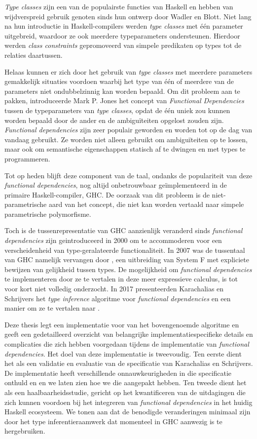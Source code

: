 \textit{Type classes} zijn een van de populairste functies van Haskell en hebben
van wijdverspreid gebruik genoten sinds hun ontwerp door Wadler en Blott.  Niet
lang na hun introductie in Haskell-compilers werden \textit{type classes} met
één parameter uitgebreid, waardoor ze ook meerdere typeparameters ondersteunen.
Hierdoor werden \textit{class constraints} gepromoveerd van simpele predikaten
op types tot de relaties daartussen.

Helaas kunnen er zich door het gebruik van \textit{type classes} met meerdere
parameters gemakkelijk situaties voordoen waarbij het type van één of meerdere
van de parameters niet ondubbelzinnig kan worden bepaald. Om dit probleem aan te
pakken, introduceerde Mark P. Jones het concept van \textit{Functional
Dependencies} tussen de typeparameters van \textit{type classes}, opdat de één
uniek zou kunnen worden bepaald door de ander en de ambiguïteiten opgelost
zouden zijn. \textit{Functional dependencies} zijn zeer populair geworden en
worden tot op de dag van vandaag gebruikt. Ze worden niet alleen gebruikt om
ambiguïteiten op te lossen, maar ook om semantische eigenschappen statisch af te
dwingen en met types te programmeren.

Tot op heden blijft deze component van de taal, ondanks de populariteit van deze
\textit{functional dependencies}, nog altijd onbetrouwbaar geïmplementeerd in de
primaire Haskell-compiler, GHC. De oorzaak van dit probleem is de
niet-parametrische aard van het concept, die niet kan worden vertaald naar
simpele parametrische polymorfisme.

Toch is de tussenrepresentatie van GHC aanzienlijk veranderd sinds
\textit{functional dependencies} zijn geintroduceerd in 2000 om te accommoderen
voor een verscheidenheid van type-geralateerde functionaliteit. In 2007 was de
tussentaal van GHC namelijk vervangen door \systemfc, een uitbreiding van System
F met expliciete bewijzen van gelijkheid tussen types.  De mogelijkheid om
\textit{functional dependencies} te implementeren door ze te vertalen in deze
meer expressieve calculus, is tot voor kort niet volledig onderzocht. In 2017
presenteerden Karachalias en Schrijvers het \textit{type inference} algoritme
voor \textit{functional dependencies} en een manier om ze te vertalen naar
\systemfc.

Deze thesis legt een implementatie voor van het bovengenoemde algoritme en geeft
een gedetailleerd overzicht van belangrijke implementatiespecifieke details en
complicaties die zich hebben voorgedaan tijdens de implementatie van
\textit{functional dependencies}.
%
Het doel van deze implementatie is tweevoudig.
%
Ten eerste dient het als een validatie en evaluatie van de specificatie van
Karachalias en Schrijvers. De implementatie heeft verschillende
onnauwkeurigheden in die specificatie onthuld en en we laten zien hoe we die
aangepakt hebben.
%
Ten tweede dient het als een haalbaarheidsstudie, gericht op het kwantificeren
van de uitdagingen die zich kunnen voordoen bij het integreren van
\textit{functional dependencies} in het huidig Haskell ecosysteem. We tonen aan
dat de benodigde veranderingen minimaal zijn door het type inferentieraamwerk
dat momenteel in GHC aanwezig is te hergebruiken.
